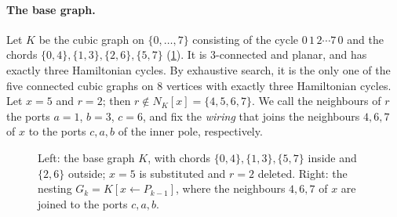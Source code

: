\documentclass[11pt]{article}
\theoremstyle{definition}
\begin{document}
\paragraph{The base graph.} Let $K$ be the cubic graph on $\{0, \dots, 7\}$ consisting of the cycle
$0\,1\,2 \cdots 7\,0$ and the chords $\{0,4\}, \{1,3\}, \{2,6\}, \{5,7\}$ (\cref{fig:K}). It is
3-connected and planar, and has exactly three Hamiltonian cycles. By exhaustive search, it is the
only one of the five connected cubic graphs on 8 vertices with exactly three Hamiltonian cycles. Let $x = 5$ and $r = 2$; then $r \notin N_K[x] = \{4,5,6,7\}$. We
call the neighbours of $r$ the ports $a = 1$, $b = 3$, $c = 6$, and fix the \emph{wiring} that joins
the neighbours $4, 6, 7$ of $x$ to the ports $c, a, b$ of the inner pole, respectively.

\begin{figure}[t]
\centering
\begin{minipage}{0.42\textwidth}\centering
{}
\end{minipage}\hfill
\begin{minipage}{0.55\textwidth}\centering
{}
\end{minipage}
\caption{Left: the base graph $K$, with chords $\{0,4\},\{1,3\},\{5,7\}$ inside and $\{2,6\}$
outside; $x = 5$ is substituted and $r = 2$ deleted. Right: the nesting $G_k = K[x \leftarrow
P_{k-1}]$, where the neighbours $4, 6, 7$ of $x$ are joined to the ports $c, a, b$.}
\label{fig:K}
\end{figure}
\end{document}

